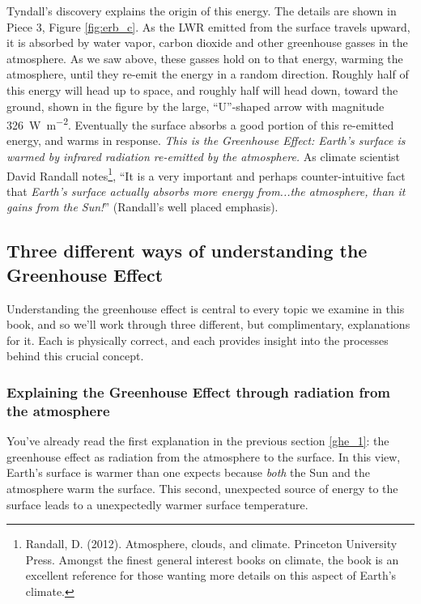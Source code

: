 \documentclass[amstex,12pt]{book}
\begin{document}
Tyndall's discovery explains the origin of this energy. The details are shown in Piece 3, Figure \ref{fig:erb_c}. As the LWR emitted from the surface travels upward, it is absorbed by water vapor, carbon dioxide and other greenhouse gasses in the atmosphere. As we saw above, these gasses hold on to that energy, warming the atmosphere, until they re-emit the energy in a random direction. Roughly half of this energy will head up to space, and roughly half will head down, toward the ground, shown in the figure by the large, ``U''-shaped arrow with magnitude \SI{326}{\watt\per\m^{2}}. Eventually the surface absorbs a good portion of this re-emitted energy, and warms in response. \emph{This is the Greenhouse Effect: Earth's surface is warmed by infrared radiation re-emitted by the atmosphere.} As climate scientist David Randall notes\footnote{Randall, D. (2012). Atmosphere, clouds, and climate. Princeton University Press. Amongst the finest general interest books on climate, the book is an excellent reference for those wanting more details on this aspect of Earth's climate.}, ``It is a very important and perhaps counter-intuitive fact that \textit{Earth's surface actually absorbs more energy from...the atmosphere, than it gains from the Sun!}'' (Randall’s well placed emphasis).

\subsection{Three different ways of understanding the Greenhouse Effect}
Understanding the greenhouse effect is central to every topic we examine in this book, and so we'll work through three different, but complimentary, explanations for it. Each is physically correct, and each provides insight into the processes behind this crucial concept.
\subsubsection{Explaining the Greenhouse Effect through radiation from the atmosphere}
You've already read the first explanation in the previous section \ref{ghe_1}: the greenhouse effect as radiation from the atmosphere to the surface. In this view, Earth's surface is warmer than one expects because \emph{both} the Sun and the atmosphere warm the surface. This second, unexpected source of energy to the surface leads to a unexpectedly warmer surface temperature. 
\end{document}
